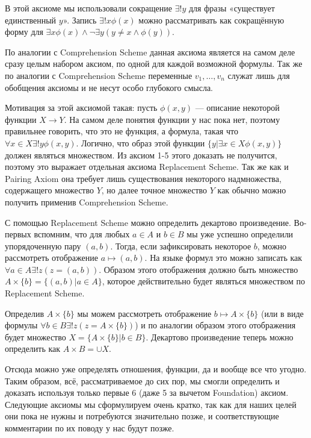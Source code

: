 В этой аксиоме мы использовали сокращение $\exists!y$ для фразы «существует единственный $y$». Запись $\exists!x\phi(x)$ можно рассматривать как сокращённую форму для $\exists x \phi(x) \wedge \neg \exists y (y\not=x \wedge \phi(y))$.

По аналогии с Comprehension Scheme данная аксиома является на самом деле сразу целым набором аксиом, по одной для каждой возможной формулы. Так же по аналогии с Comprehension Scheme переменные $v_1, \ldots, v_n$ служат лишь для обобщения аксиомы и не несут особо глубокого смысла.

Мотивация за этой аксиомой такая: пусть $\phi(x, y)$ — описание некоторой функции $X\to Y$. На самом деле понятия функции у нас пока нет, поэтому правильнее говорить, что это не функция, а формула, такая что $\forall x\in X \exists!y \phi(x, y)$. Логично, что образ этой функции $\{y|\exists x \in X \phi(x, y)\}$ должен являться множеством. Из аксиом 1-5 этого доказать не получится, поэтому это выражает отдельная аксиома Replacement Scheme. Так же как и Pairing Axiom она требует лишь существования некоторого надмножества, содержащего множество $Y$, но далее точное множество $Y$ как обычно можно получить применив Comprehension Scheme.

С помощью Replacement Scheme можно определить декартово произведение. Во-первых вспомним, что для любых $a\in A$ и $b\in B$ мы уже успешно определили упорядоченную пару $(a, b)$. Тогда, если зафиксировать некоторое $b$, можно рассмотреть отображение $a \mapsto (a, b)$. На языке формул это можно записать как $\forall a\in A \exists!z (z = (a, b))$. Образом этого отображения должно быть множество $A\times\{b\} = \{(a, b)| a\in A\}$, которое действительно будет являться множеством по Replacement Scheme.

Определив $A\times\{b\}$ мы можем рассмотреть отображение $b\mapsto A \times \{b\}$ (или в виде формулы $\forall b\in B \exists! z (z = A\times\{b\})$) и по аналогии образом этого отображения будет множество $X = \{A\times \{ b \} | b \in B\}$. Декартово произведение теперь можно определить как $A\times B = \cup X$.

Отсюда можно уже определять отношения, функции, да и вообще все что угодно. Таким образом, всё, рассматриваемое до сих пор, мы смогли определить и доказать используя только первые 6 (даже 5 за вычетом Foundation) аксиом. Следующие аксиомы мы сформулируем очень кратко, так как для наших целей они пока не нужны и потребуются значительно позже, и соответствующие комментарии по их поводу у нас будут позже.

